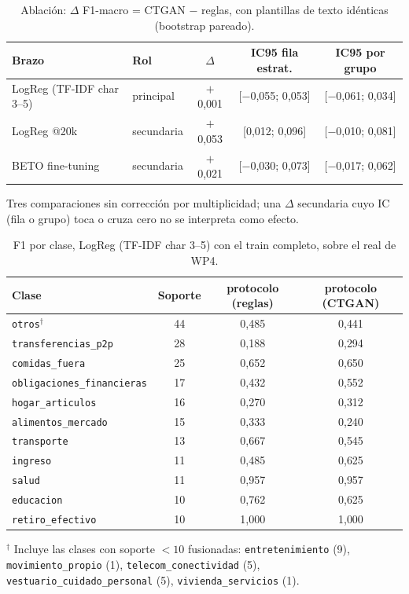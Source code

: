 \begin{table}[ht]\centering\small
\caption{Ablación: $\Delta$ F1-macro = CTGAN $-$ reglas, con plantillas de texto idénticas (bootstrap pareado).}
\label{tab:ablacion}
\begin{tabular}{llccc}
\toprule
Brazo & Rol & $\Delta$ & IC95 fila estrat. & IC95 por grupo \\
\midrule
LogReg (TF-IDF char 3--5) & principal & $+$0{,}001 & [$-$0{,}055; 0{,}053] & [$-$0{,}061; 0{,}034] \\
LogReg @20k & secundaria & $+$0{,}053 & [0{,}012; 0{,}096] & [$-$0{,}010; 0{,}081] \\
BETO fine-tuning & secundaria & $+$0{,}021 & [$-$0{,}030; 0{,}073] & [$-$0{,}017; 0{,}062] \\
\bottomrule
\end{tabular}
\par\footnotesize Tres comparaciones sin corrección por multiplicidad; una $\Delta$ secundaria cuyo IC (fila o grupo) toca o cruza cero no se interpreta como efecto.
\end{table}

\begin{table}[ht]\centering\small
\caption{F1 por clase, LogReg (TF-IDF char 3--5) con el train completo, sobre el real de WP4.}
\label{tab:por_clase}
\begin{tabular}{lccc}
\toprule
Clase & Soporte & protocolo (reglas) & protocolo (CTGAN) \\
\midrule
\texttt{otros}$^{\dagger}$ & 44 & 0{,}485 & 0{,}441 \\
\texttt{transferencias\_p2p} & 28 & 0{,}188 & 0{,}294 \\
\texttt{comidas\_fuera} & 25 & 0{,}652 & 0{,}650 \\
\texttt{obligaciones\_financieras} & 17 & 0{,}432 & 0{,}552 \\
\texttt{hogar\_articulos} & 16 & 0{,}270 & 0{,}312 \\
\texttt{alimentos\_mercado} & 15 & 0{,}333 & 0{,}240 \\
\texttt{transporte} & 13 & 0{,}667 & 0{,}545 \\
\texttt{ingreso} & 11 & 0{,}485 & 0{,}625 \\
\texttt{salud} & 11 & 0{,}957 & 0{,}957 \\
\texttt{educacion} & 10 & 0{,}762 & 0{,}625 \\
\texttt{retiro\_efectivo} & 10 & 1{,}000 & 1{,}000 \\
\bottomrule
\end{tabular}
\par\footnotesize $^{\dagger}$ Incluye las clases con soporte $<10$ fusionadas: \texttt{entretenimiento} (9), \texttt{movimiento\_propio} (1), \texttt{telecom\_conectividad} (5), \texttt{vestuario\_cuidado\_personal} (5), \texttt{vivienda\_servicios} (1).
\end{table}

